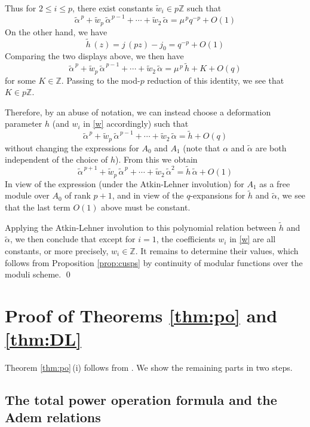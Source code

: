 \documentclass{gtpart}
\theoremstyle{definition}
\theoremstyle{remark}
\newcommand{\mb}[1]{\mathbb{#1}}
\newcommand{\BZ}{{\mb Z}}
\newcommand{\tA}{\widetilde{\A}}
\renewcommand{\th}{\widetilde{h}}
\newcommand{\tw}{\widetilde{w}}
\newcommand{\A}{\alpha}
\renewcommand{\=}{\approx}
\renewcommand{\-}{\sim}
\numberwithin{equation}{section}
\begin{document}
Thus for $2 \leq i \leq p$, there exist constants $\tw_i \in p\BZ$ such that 
\[
 \tA^{\,p} + \tw_p \, \tA^{\,p - 1} + \cdots + \tw_2 \, \tA = \mu^{\,p} q^{-p} 
 + O(1) 
\]
On the other hand, we have 
\[
 \th\,(z) = j\,(p z) - j_0 = q^{-p} + O(1) 
\]
Comparing the two displays above, we then have 
\[
 \tA^{\,p} + \tw_p \, \tA^{\,p - 1} + \cdots + \tw_2 \, \tA = \mu^{\,p} \, \th 
 + K + O(q) 
\]
for some $K \in \BZ$.  Passing to the mod-$p$ reduction of this identity, we see 
that $K \in p\BZ$.  

Therefore, by an abuse of notation, we can instead choose a deformation 
parameter $h$ (and $w_i$ in \eqref{w} accordingly) such that 
\[
 \tA^{\,p} + \tw_p \, \tA^{\,p - 1} + \cdots + \tw_2 \, \tA = \th + O(q) 
\]
without changing the expressions for $A_0$ and $A_1$ (note that $\A$ and $\tA$ 
are both independent of the choice of $h$).  From this we obtain 
\[
 \tA^{\,p + 1} + \tw_p \, \tA^{\,p} + \cdots + \tw_2 \, \tA^2 = \th \, \tA 
 + O(1) 
\]
In view of the expression (under the Atkin-Lehner involution) for $A_1$ as a 
free module over $A_0$ of rank $p + 1$, and in view of the $q$-expansions for 
$\th$ and $\tA$, we see that the last term $O(1)$ above must be constant.  

Applying the Atkin-Lehner involution to this polynomial relation between $\th$ 
and $\tA$, we then conclude that except for $i = 1$, the coefficients $w_i$ in 
\eqref{w} are all constants, or more precisely, $w_i \in \BZ$.  It remains to 
determine their values, which follows from Proposition \ref{prop:cusps} by 
continuity of modular functions over the moduli scheme.  \qed



\section{Proof of Theorems \ref{thm:po} and \ref{thm:DL}}
\label{sec:pff}

Theorem \ref{thm:po}\,(i) follows from \cite[Theorem 1.1]{Str98}.  We show the 
remaining parts in two steps.  

\subsection{The total power operation formula and the Adem relations}
\end{document}
